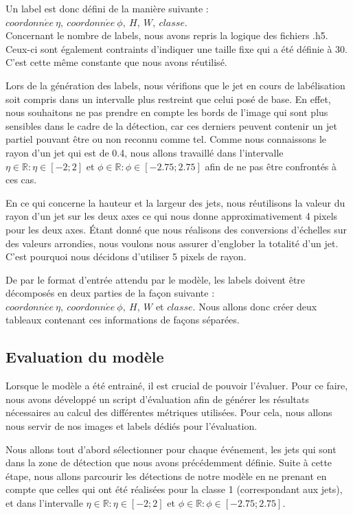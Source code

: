 Un label est donc défini de la manière suivante : $coordonn\acute{e}e \: \eta, \: coordonn\acute{e}e \: \phi, \: H, \: W, \: classe$.\\

Concernant le nombre de labels, nous avons repris la logique des fichiers .h5. Ceux-ci sont également contraints d'indiquer une taille fixe qui a été définie à 30. C'est cette même constante que nous avons réutilisé.

Lors de la génération des labels, nous vérifions que le jet en cours de labélisation soit compris dans un intervalle plus restreint que celui posé de base. En effet, nous souhaitons ne pas prendre en compte les bords de l'image qui sont plus sensibles dans le cadre de la détection, car ces derniers peuvent contenir un jet partiel pouvant être ou non reconnu comme tel. Comme nous connaissons le rayon d'un jet qui est de 0.4, nous allons travaillé dans l'intervalle $\eta \in \mathbb{R} : \eta \in [-2;2]$ et $\phi \in \mathbb{R} : \phi \in [-2.75;2.75]$ afin de ne pas être confrontés à ces cas.

En ce qui concerne la hauteur et la largeur des jets, nous réutilisons la valeur du rayon d'un jet sur les deux axes ce qui nous donne approximativement 4 pixels pour les deux axes. Étant donné que nous réalisons des conversions d'échelles sur des valeurs arrondies, nous voulons nous assurer d'englober la totalité d'un jet. C'est pourquoi nous décidons d'utiliser 5 pixels de rayon.

De par le format d'entrée attendu par le modèle, les labels doivent être décomposés en deux parties de la façon suivante : $coordonn\acute{e}e \: \eta, \: coordonn\acute{e}e \: \phi, \: H, \: W$ et $classe$. Nous allons donc créer deux tableaux contenant ces informations de façons séparées.

\subsection{Evaluation du modèle}
\label{subsec:yolov8_model_evaluation}

Lorsque le modèle a été entrainé, il est crucial de pouvoir l'évaluer. Pour ce faire, nous avons développé un script d'évaluation afin de générer les résultats nécessaires au calcul des différentes métriques utilisées. Pour cela, nous allons nous servir de nos images et labels dédiés pour l'évaluation.

Nous allons tout d'abord sélectionner pour chaque événement, les jets qui sont dans la zone de détection que nous avons précédemment définie. Suite à cette étape, nous allons parcourir les détections de notre modèle en ne prenant en compte que celles qui ont été réalisées pour la classe 1 (correspondant aux jets), et dans l'intervalle $\eta \in \mathbb{R} : \eta \in [-2;2]$ et $\phi \in \mathbb{R} : \phi \in [-2.75;2.75]$.


